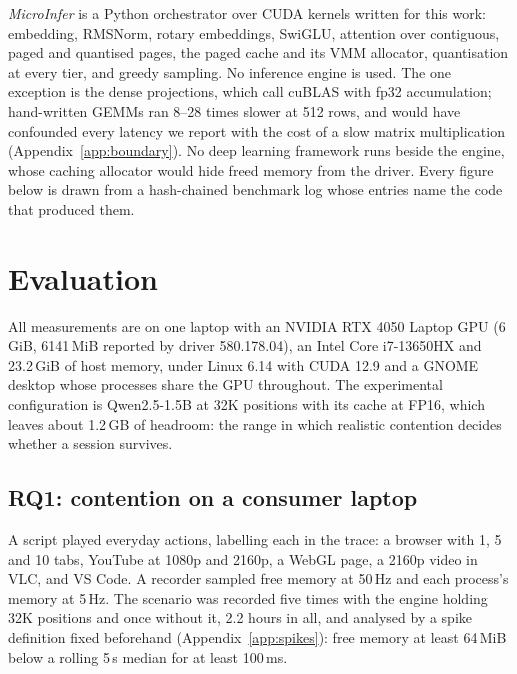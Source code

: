 \documentclass{article}
\begin{document}
\textit{MicroInfer} is a Python orchestrator over CUDA kernels written for
this work: embedding, RMSNorm, rotary embeddings, SwiGLU, attention over
contiguous, paged and quantised pages, the paged cache and its VMM allocator,
quantisation at every tier, and greedy sampling. No inference engine is used.
The one exception is the dense projections, which call cuBLAS
\cite{cublas} with fp32 accumulation; hand-written GEMMs ran 8--28 times slower
at 512 rows, and would have confounded every latency we report with the cost of
a slow matrix multiplication (Appendix~\ref{app:boundary}). No deep learning
framework runs beside the engine, whose caching allocator would hide freed
memory from the driver. Every figure below is drawn from a hash-chained
benchmark log whose entries name the code that produced them.

\section{Evaluation}
\label{sec:evaluation}

All measurements are on one laptop with an NVIDIA RTX 4050 Laptop GPU (6\,GiB,
6141\,MiB reported by driver 580.178.04), an Intel Core i7-13650HX and
23.2\,GiB of host memory, under Linux 6.14 with CUDA 12.9 and a GNOME desktop
whose processes share the GPU throughout. The experimental configuration is
Qwen2.5-1.5B at 32K positions with its cache at FP16, which leaves about
1.2\,GB of headroom: the range in which realistic contention decides whether a
session survives.

\subsection{RQ1: contention on a consumer laptop}
\label{sec:rq1}

A script played everyday actions, labelling each in the trace: a browser with
1, 5 and 10 tabs, YouTube at 1080p and 2160p, a WebGL page, a 2160p video in
VLC, and VS Code. A recorder sampled free memory at 50\,Hz and each process's
memory at 5\,Hz. The scenario was recorded five times with the engine holding
32K positions and once without it, 2.2 hours in all, and analysed by a spike
definition fixed beforehand (Appendix~\ref{app:spikes}): free memory at least
64\,MiB below a rolling 5\,s median for at least 100\,ms.
\end{document}
